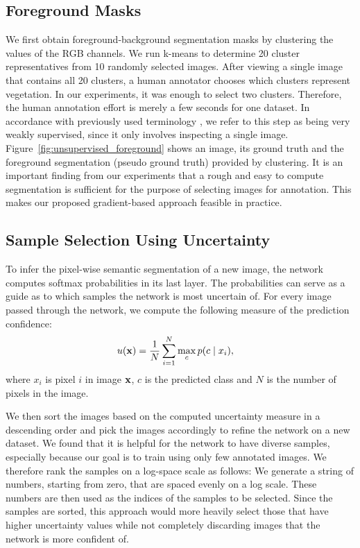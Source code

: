 \documentclass[letterpaper, 10 pt, conference]{ieeeconf}  %
\begin{document}
\subsection{Foreground Masks}

We first obtain foreground-background segmentation masks by clustering the values of the RGB channels. We run k-means to determine 20 cluster representatives from 10 randomly selected images. After viewing a single image that contains all 20 clusters, a human annotator chooses which clusters represent vegetation. In our experiments, it was enough to select two clusters. Therefore, the human annotation effort is merely a few seconds for one dataset. In accordance with previously used terminology \cite{zhang2018self}, we refer to this step as being very weakly supervised, since it only involves inspecting a single image. Figure~\ref{fig:unsupervised_foreground} shows an image, its ground truth and the foreground segmentation (pseudo ground truth) provided by clustering. It is an important finding from our experiments that a rough and easy to compute segmentation is sufficient for the purpose of selecting images for annotation. This makes our proposed gradient-based approach feasible in practice.



\subsection{Sample Selection Using Uncertainty}
\label{ssec:unc}
To infer the pixel-wise semantic segmentation of a new image, the network computes softmax probabilities in its last layer. The probabilities can serve as a guide as to which samples the network is most uncertain of. For every image passed through the network, we compute the following measure of the prediction confidence:
\begin{align}
u(\bold{x}) &= \frac{1}{N} \sum_{i=1}^N \max_c p(c  \mid  x_i),
\end{align}  
\noindent
where $x_i$ is pixel $i$ in image $\bold{x}$, $c$ is the predicted class and $N$ is the number of pixels in the image.

We then sort the images based on the computed uncertainty measure in a descending order and pick the images accordingly to refine the network on a new dataset. We found that it is helpful for the network to have diverse samples, especially because our goal is to train using only few annotated images. We therefore rank the samples on a log-space scale as follows: We generate a string of numbers, starting from zero, that are spaced evenly on a log scale. These numbers are then used as the indices of the samples to be selected. Since the samples are sorted, this approach would more heavily select those that have higher uncertainty values while not completely discarding images that the network is more confident of.
\end{document}
